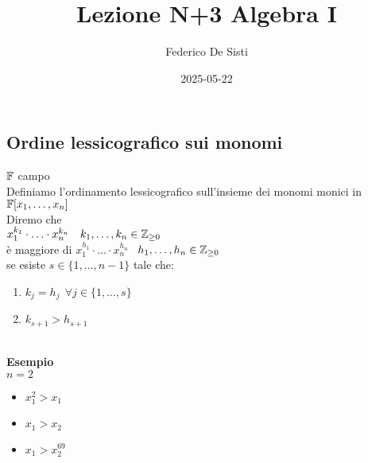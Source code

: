 \documentclass[12px]{article}
\title{Lezione N+3 Algebra I}
\date{2025-05-22}
\author{Federico De Sisti}
\begin{document}
	\maketitle
	\newpage
	\subsection{Ordine lessicografico sui monomi}
	$\mathbb{F}$ campo\\
	Definiamo l'ordinamento lessicografico sull'insieme dei monomi monici in $\mathbb{F}[x_1,\ldots,x_n]$\\
	Diremo che \\
	$x^{k_1}_1\cdot\ldots \cdot x_n^{k_n}\ \ \ k_1,\ldots,k_n\in\Z_{\geq 0}$\\
	è maggiore di $x_1^{h_1}\cdot\ldots\cdot x_n^{h_n}$ \ $h_1,\ldots,h_n\in\mathbb{Z}_{\geq 0}$\\
	se esiste $s\in \{1,\ldots, n-1\}$ tale che:
	 \begin{enumerate}
		 \item $k_j = h_j\ \ \forall j\in \{1,\ldots,s\}$
		 \item  $k_{s+1} > h_{s + 1}$
	\end{enumerate}\\
	\textbf{Esempio}\\
$n = 2$
 \begin{itemize}
	 \item $x_1^2 > x_1$
	 \item $x_1 > x_2$
	 \item $x_1 > x_2^{69}$
\end{itemize}
\end{document}
